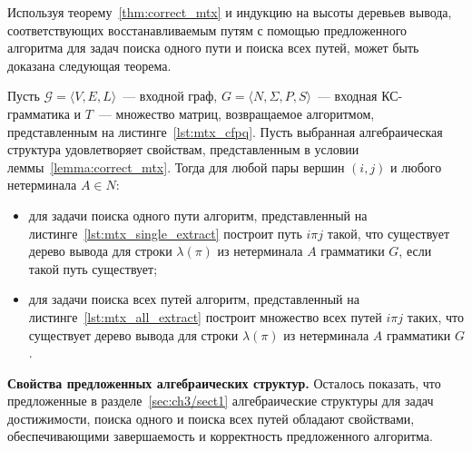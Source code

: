 Используя теорему~\ref{thm:correct_mtx} и индукцию на высоты деревьев вывода, соответствующих восстанавливаемым путям с помощью предложенного алгоритма для задач поиска одного пути и поиска всех путей, может быть доказана следующая теорема.

\begin{theorem}\label{thm:correct_extraction_single_all_mtx}
Пусть $\mathcal{G} = \langle V, E, L \rangle$~--- входной граф, $G =\langle N, \Sigma, P, S \rangle$~--- входная КС-грамматика и $T$~--- множество матриц, возвращаемое алгоритмом, представленным на листинге~\ref{lst:mtx_cfpq}. Пусть выбранная алгебраическая структура удовлетворяет свойствам, представленным в условии леммы~\ref{lemma:correct_mtx}. Тогда для любой пары вершин $(i, j)$ и любого нетерминала $A \in N$:
	\begin{itemize}
	    \item для задачи поиска одного пути алгоритм, представленный на листинге~\ref{lst:mtx_single_extract} построит путь $i \pi j$ такой, что существует дерево вывода для строки $\lambda(\pi)$ из нетерминала $A$ грамматики $G$, если такой путь существует;
	    \item для задачи поиска всех путей алгоритм, представленный на листинге~\ref{lst:mtx_all_extract} построит множество всех путей $i \pi j$ таких, что существует дерево вывода для строки $\lambda(\pi)$ из нетерминала $A$ грамматики $G$.
	\end{itemize}
\end{theorem}

\textbf{Свойства предложенных алгебраических структур.} Осталось показать, что предложенные в разделе~\ref{sec:ch3/sect1} алгебраические структуры для задач достижимости, поиска одного и поиска всех путей обладают свойствами, обеспечивающими завершаемость и корректность предложенного алгоритма.

